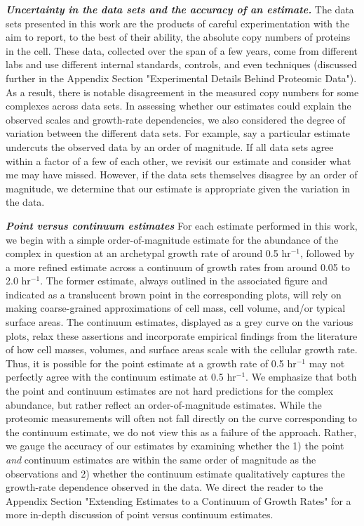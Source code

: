 \begin{featurebox}
\textbf{\itshape Uncertainty in the data sets and the accuracy of an estimate.}
The data sets presented in this work are the products of careful experimentation
with the aim to report, to the best of their ability, the absolute copy numbers
of proteins in the cell. These data, collected over the span of a few years,
come from different labs and use different internal standards, controls, and
even techniques (discussed further in the Appendix Section "Experimental Details
Behind Proteomic Data"). As a result, there is notable disagreement in the
measured copy numbers for some complexes across data sets. In assessing whether
our estimates could explain the observed scales and growth-rate dependencies, we
also considered the degree of variation between the different data sets. For
example, say a particular estimate undercuts the observed data by an order of
magnitude. If all data sets agree within a factor of a few of each other, we
revisit our estimate and consider what me may have missed. However, if the data
sets themselves disagree by an order of magnitude, we determine that our
estimate is appropriate given the variation in the data.
\label{box:estimate_rules}

\textbf{\itshape  Point versus continuum estimates}
For each estimate performed in this work, we begin with a simple
order-of-magnitude estimate for the abundance of the complex in question at
an archetypal growth rate of around 0.5 hr$^{-1}$, followed by a more refined
estimate across a continuum of growth rates from around 0.05 to 2.0
hr$^{-1}$. The former estimate, always outlined in the associated figure and
indicated as a translucent brown point in the corresponding plots, will rely
on making coarse-grained approximations of cell mass, cell volume, and/or
typical surface areas. The continuum estimates, displayed as a grey curve on
the various plots, relax these assertions and incorporate empirical findings
from the literature of how cell masses, volumes, and surface areas scale with
the cellular growth rate. Thus, it is possible for the point estimate at a
growth rate of 0.5 hr$^{-1}$ may not perfectly agree with the continuum
estimate at 0.5 hr$^{-1}$. We emphasize that both the point and continuum
estimates are not hard predictions for the complex abundance, but rather
reflect an order-of-magnitude estimates. While the proteomic measurements
will often not fall directly on the curve corresponding to the continuum
estimate, we do not view this as a failure of the approach. Rather, we gauge
the accuracy of our estimates by examining whether the 1) the point
\textit{and} continuum estimates are within the same order of magnitude as
the observations and 2) whether the continuum estimate qualitatively captures
the growth-rate dependence observed in the data. We direct the reader to the
Appendix Section "Extending Estimates to a Continuum of Growth Rates" for a more 
in-depth discussion of point versus continuum estimates.

\end{featurebox}


